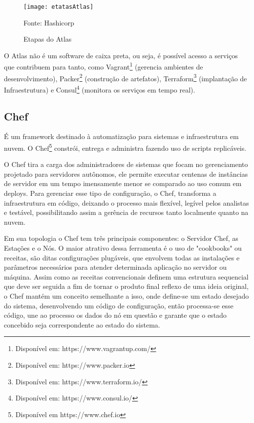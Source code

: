 \begin{figure}[htb]

	\centering
	\texttt{[image: etatasAtlas]}
	\caption{Etapas do Atlas}
	Fonte: Hashicorp\footnotemark
	\label{fig:etatasAtlas}


\end{figure}




O Atlas não é um software de caixa preta, ou seja, é possível acesso a serviços que contribuem para tanto, como Vagrant\footnote{Disponível em: https://www.vagrantup.com/} (gerencia ambientes de desenvolvimento), Packer\footnote{Disponível em: https://www.packer.io} (construção de artefatos), Terraform\footnote{Disponível em: https://www.terraform.io/} (implantação de Infraestrutura) e Consul\footnote{Disponível em: https://www.consul.io/} (monitora os serviços em tempo real).

\subsection{Chef}

É um framework destinado à automatização para sistemas e infraestrutura em nuvem. O Chef\footnote{Disponível em https://www.chef.io} constrói, entrega e administra fazendo uso de scripts replicáveis.

O Chef tira a carga dos administradores de sistemas que focam no gerenciamento projetado para servidores autônomos, ele permite executar centenas de instâncias de servidor em um tempo imensamente menor se comparado ao uso comum em deploys. Para gerenciar esse tipo de configuração, o Chef, transforma a infraestrutura em código, deixando o processo mais flexível, legível pelos analistas e testável, possibilitando assim a gerência de recursos tanto localmente quanto na nuvem.\cite{lecheta2014aws}

Em sua topologia o Chef tem três principais componentes: o Servidor Chef, as Estações e o Nós. O maior atrativo dessa ferramenta é o uso de "cookbooks" ou receitas, são ditas configurações plugáveis, que envolvem todas as instalações e parâmetros necessários para atender determinada aplicação no servidor ou máquina. Assim como as receitas convencionais definem uma estrutura sequencial que deve ser seguida a fim de tornar o produto final reflexo de uma ideia original, o Chef mantém um conceito semelhante a isso, onde define-se um estado desejado do sistema, desenvolvendo um código de configuração, então processa-se esse código, une ao processo os dados do nó em questão e garante que o estado concebido seja correspondente ao estado do sistema. \cite{garzotto2006chef}

